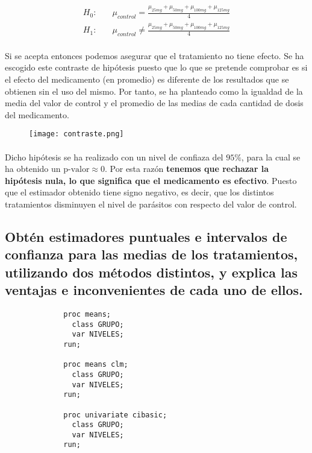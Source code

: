 \documentclass{article}
\begin{document}
      \begin{align*}
        H_0:& \quad \mu_{control} = \frac{\mu_{25mg} + \mu_{50mg} +\mu_{100mg} +\mu_{125mg}}{4} \\
        H_1:& \quad \mu_{control} \neq \frac{\mu_{25mg} + \mu_{50mg} +\mu_{100mg} +\mu_{125mg}}{4}
      \end{align*}

      \paragraph{}
      Si se acepta entonces podemos asegurar que el tratamiento no tiene efecto. Se ha escogido este contraste de hipótesis puesto que lo que se pretende comprobar es si el efecto del medicamento (en promedio) es diferente de los resultados que se obtienen sin el uso del mismo. Por tanto, se ha planteado como la igualdad de la media del valor de control y el promedio de las medias de cada cantidad de dosis del medicamento.


          \begin{figure}[H]
            \centering
            \texttt{[image: contraste.png]}
          \end{figure}

      \paragraph{}
      Dicho hipótesis se ha realizado con un nivel de confiaza del $95\%$, para la cual se ha obtenido un $\text{p-valor}\approx 0$. Por esta razón \textbf{tenemos que rechazar la hipótesis nula, lo que significa que el medicamento es efectivo}. Puesto que el estimador obtenido tiene signo negativo, es decir, que los distintos tratamientos disminuyen el nivel de parásitos con respecto del valor de control.

    \subsection{Obtén estimadores puntuales e intervalos de confianza para las medias de los tratamientos, utilizando dos métodos distintos, y explica las ventajas e inconvenientes de cada uno de ellos.}

    \begin{figure}[h]
      \centering
      \begin{verbatim}
        proc means;
          class GRUPO;
          var NIVELES;
        run;

        proc means clm;
          class GRUPO;
          var NIVELES;
        run;

        proc univariate cibasic;
          class GRUPO;
          var NIVELES;
        run;
      \end{verbatim}
      \label{code:sas_4}
    \end{figure}
\end{document}
